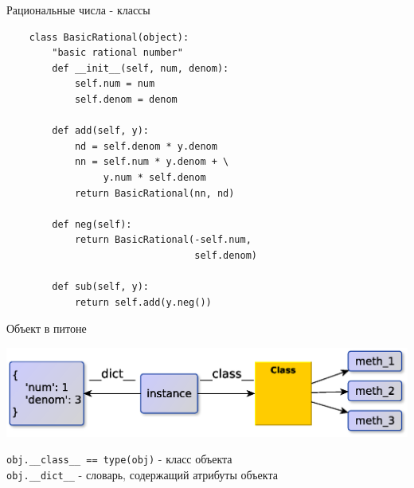 \documentclass{article}
\begin{document}
\begin{center} Рациональные числа - классы \end{center}
\begin{lstlisting}
    class BasicRational(object):
        "basic rational number"
        def __init__(self, num, denom):
            self.num = num
            self.denom = denom

        def add(self, y):
            nd = self.denom * y.denom
            nn = self.num * y.denom + \
                 y.num * self.denom
            return BasicRational(nn, nd)

        def neg(self):
            return BasicRational(-self.num,
                                 self.denom)

        def sub(self, y):
            return self.add(y.neg())
\end{lstlisting}
\newpage

\begin{center} Объект в питоне \end{center} 
\begin{center} \includegraphics[scale=0.8]{images/python_instance.eps} \end{center} 
\lstinline!obj.__class__ == type(obj)! - класс объекта \\
\lstinline!obj.__dict__! - словарь, содержащий атрибуты объекта
\newpage
\end{document}
